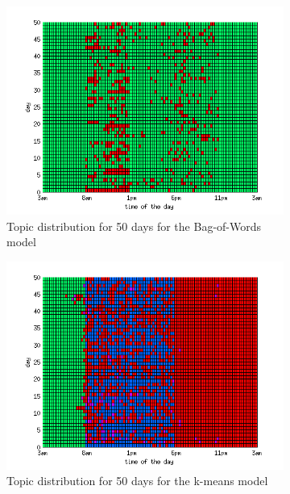 \documentclass[11pt,a4paper]{article}
\begin{document}
\begin{figure}[h!]
 \centering
 \begin{subfigure}[b]{0.45\linewidth}
  \centering
  \includegraphics[width=\textwidth]{Pictures/DayTopicsTs96k5bow.png}
  \caption{Topic distribution for 50 days for the Bag-of-Words model}
  \label{fig:bow96}
 \end{subfigure}
 \begin{subfigure}[b]{0.45\linewidth}
  \centering
  \includegraphics[width=\textwidth]{Pictures/DayTopicsTs96k5Clus.png}
  \caption{Topic distribution for 50 days for the k-means model}
  \label{fig:kMeans96}
 \end{subfigure}
 \caption{}
\end{figure}
\end{document}
